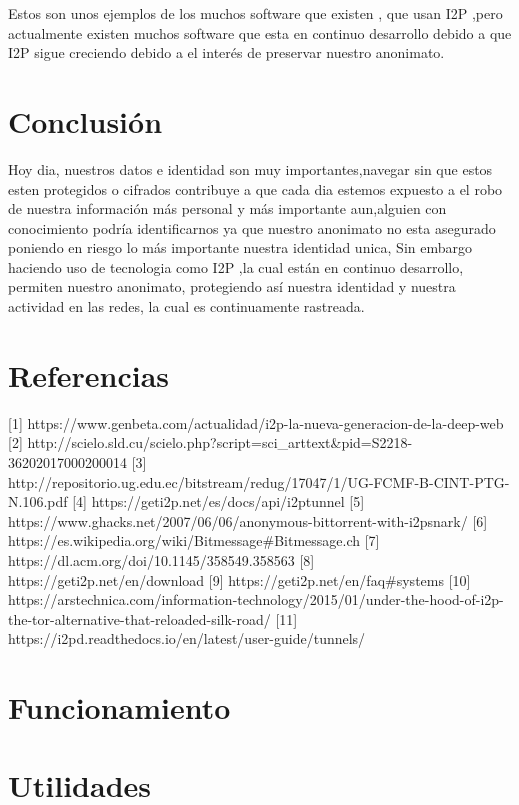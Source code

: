 \documentclass{article}
\begin{document}
Estos son unos  ejemplos de los muchos software que existen , que usan I2P ,pero actualmente existen muchos software que esta en continuo desarrollo debido a que 
I2P sigue creciendo debido a el interés de preservar nuestro anonimato.

\pagebreak

\section{Conclusión}
Hoy dia, nuestros datos e identidad son muy importantes,navegar sin que estos esten protegidos o cifrados contribuye a que cada dia estemos expuesto
a el robo de  nuestra información más personal y más importante aun,alguien con conocimiento podría identificarnos ya que nuestro anonimato no esta asegurado 
poniendo en riesgo lo más importante nuestra identidad unica, Sin embargo haciendo uso de tecnologia como I2P ,la cual  están en continuo desarrollo,
permiten nuestro anonimato, protegiendo así nuestra identidad y nuestra actividad en las redes, la cual es continuamente rastreada.

\pagebreak

\section{Referencias}

[1] https://www.genbeta.com/actualidad/i2p-la-nueva-generacion-de-la-deep-web
[2] http://scielo.sld.cu/scielo.php?script=sci_arttext&pid=S2218-36202017000200014
[3] http://repositorio.ug.edu.ec/bitstream/redug/17047/1/UG-FCMF-B-CINT-PTG-N.106.pdf
[4] https://geti2p.net/es/docs/api/i2ptunnel
[5] https://www.ghacks.net/2007/06/06/anonymous-bittorrent-with-i2psnark/
[6] https://es.wikipedia.org/wiki/Bitmessage#Bitmessage.ch
[7] https://dl.acm.org/doi/10.1145/358549.358563
[8] https://geti2p.net/en/download
[9] https://geti2p.net/en/faq#systems
[10] https://arstechnica.com/information-technology/2015/01/under-the-hood-of-i2p-the-tor-alternative-that-reloaded-silk-road/
[11] https://i2pd.readthedocs.io/en/latest/user-guide/tunnels/



\section{Funcionamiento}
\section{Utilidades}
\end{document}
